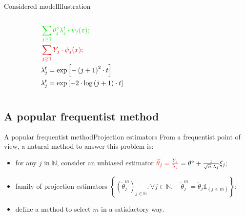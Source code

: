 \documentclass[10pt]{beamer}
\begin{document}
\begin{frame}{Considered model}{Illustration}
\begin{columns}[c]
	\begin{column}{3cm}
		\begin{alignat*}{2}
&\color{green!90!black} \sum\limits_{j \geq 1}\theta^{\circ}_{j} \lambda_{j}^{t} \cdot \psi_{j}(x);&&\\
&\color{red!90!black} \sum\limits_{j \geq 1} Y_{j} \cdot \psi_{j}(x);&&\\
&\lambda_{j}^{t} = \exp\left[-\left(j + 1\right)^{2} \cdot t \right]&&\\
&\lambda_{j}^{t} = \exp\left[-2 \cdot \log\left(j + 1\right) \cdot t \right]&&
		\end{alignat*}
	\end{column}
	\begin{column}{8cm}
		\begin{center}
		\end{center}
	\end{column}
\end{columns}
\end{frame}

%
%
%

\subsection{A popular frequentist method}
\begin{frame}{A popular frequentist method}{Projection estimators}
From a frequentist point of view, a natural method to answer this problem is:

\bigskip

\begin{itemize}
\setlength\itemsep{2em}
\item<1-> for any $j$ in $\mathbb{N}$, consider an unbiased estimator $\textcolor{red!90!black}{\widetilde{\theta}_{j} = \frac{Y_{j}}{\lambda_{j}}} = \theta^{\circ} + \frac{1}{\sqrt{n}\cdot\lambda_{j}} \xi_{j};$
\item<2-> family of projection estimators $\left\{\left(\widetilde{\theta}^{m}_{j}\right)_{j \in \mathbb{N}} : \forall j \in \mathbb{N}, \quad \widetilde{\theta}^{m}_{j} = \widetilde{\theta}_{j} \mathds{1}_{\left\{j \leq m\right\}} \right\};$
\item<3-> define a method to select $m$ in a satisfactory way.
\end{itemize}
\end{frame}
\end{document}
